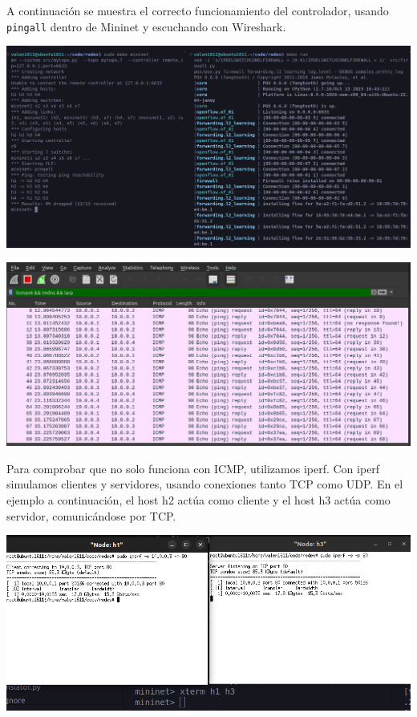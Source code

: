 \documentclass{article}
\begin{document}
A continuación se muestra el correcto funcionamiento del controlador, usando \texttt{pingall} dentro de Mininet y escuchando con Wireshark.

\begin{center}
  \includegraphics[scale=0.20]{mininet_pingall.png}

\end{center}

\begin{center}
  \includegraphics[scale=0.3]{pingAll_WS.png}

\end{center}
  
Para comprobar que no solo funciona con ICMP, utilizamos iperf. Con iperf simulamos clientes y servidores, usando conexiones tanto TCP como UDP. En el ejemplo a continuación, el host h2 actúa como cliente y el host h3 actúa como servidor, comunicándose por TCP.

\begin{center}
\includegraphics[scale=0.37]{mininet_iperf_basico.png}

\end{center}
\end{document}
